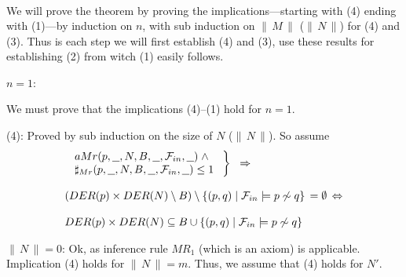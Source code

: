 \begin{theorem}
\[\begin{array}{llll}
\end{array}
\]
\proof
We will prove the theorem by proving the implications---starting with (4) ending with (1)---by induction on $n$, with sub induction on $\|\,M\,\|$ ($\|\,N\,\|$) for (4) and (3). Thus is each step we will first establish (4) and (3), use these results for establishing (2) from witch (1) easily follows.

\noindent
$n = 1$:

We must prove that the implications (4)--(1) hold for $n=1$.

\begin{trivlist}
\setlength{\labelwidth}{1.1cm}
\item[\rm (4):] Proved by sub induction on the size of $N$ ($\|\,N\,\|$). So assume
\[
\begin{array}{l}
\left.\;
\begin{array}{l}
aMr(p,\underline{\ \ },N,B,\underline{\ \ },{\cal F}_{in},\underline{\ \ })\;\wedge\\
\sharp_{Mr}(p,\underline{\ \ },N,B,\underline{\ \ },{\cal F}_{in},\underline{\ \ }) \leq 1
\end{array}
\;\right\}\;\;\Rightarrow\\
\\
(DER(p)\times DER(N) \setminus B)\setminus\{(p,q)\mid {\cal F}_{in}\models p\not\sim q\}\,= \emptyset\,\Leftrightarrow\\
\\
DER(p)\times DER(N) \subseteq B\cup\{(p,q)\mid {\cal F}_{in}\models p\not\sim q\}
\end{array}
\]

\noindent
$\|\,N\,\| = 0$: Ok, as inference rule $MR_1$ (which is an axiom) is applicable.\hfill\hbox{} Implication (4) holds for $\|\,N\,\| = m$.\hfill\hbox{} 
Thus, we assume that (4) holds for $N'$.


\end{trivlist}
\end{theorem}
